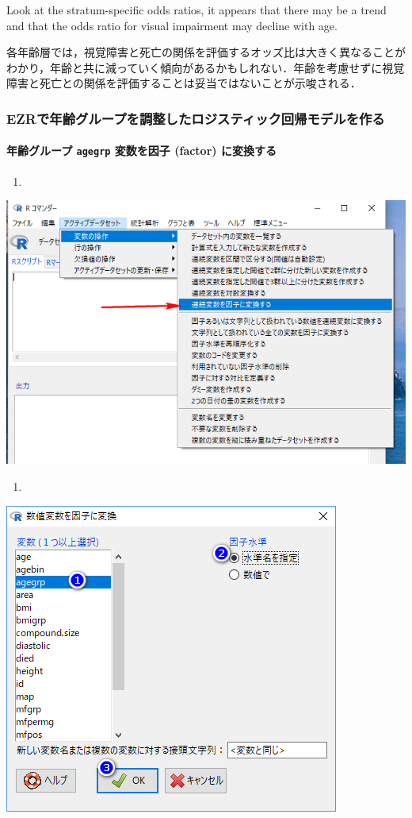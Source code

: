 \documentclass[11pt,]{problemset}
\let\oldparagraph\paragraph
\renewcommand{\paragraph}[1]{\oldparagraph{#1}\mbox{}}
\begin{document}
Look at the stratum-specific odds ratios, it appears that there may be a
trend and that the odds ratio for visual impairment may decline with
age.

各年齢層では，視覚障害と死亡の関係を評価するオッズ比は大きく異なることがわかり，年齢と共に減っていく傾向があるかもしれない．年齢を考慮せずに視覚障害と死亡との関係を評価することは妥当ではないことが示唆される．

\newpage
\vfill

\hypertarget{ezr}{%
\subsubsection{EZRで年齢グループを調整したロジスティック回帰モデルを作る}\label{ezr}}

\hypertarget{-agegrp--factor-}{%
\paragraph{\texorpdfstring{年齢グループ \texttt{agegrp} 変数を因子
(factor)
に変換する}{年齢グループ agegrp 変数を因子 (factor) に変換する}}\label{-agegrp--factor-}}

\begin{enumerate}
\def\labelenumi{\arabic{enumi}.}
\item
\end{enumerate}

\begin{center}\includegraphics[width=0.55\linewidth,height=0.5\textheight]{pic/mltlogstic00} \end{center}

\begin{enumerate}
\def\labelenumi{\arabic{enumi}.}
\setcounter{enumi}{1}
\item
\end{enumerate}

\begin{center}\includegraphics[width=0.55\linewidth,height=0.5\textheight]{pic/mltlogstic01} \end{center}
\end{document}
